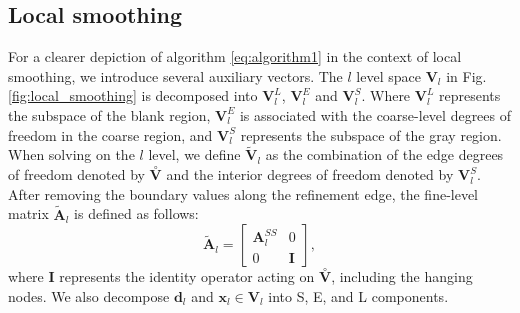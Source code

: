 \documentclass[extra, referee]{gji}
\begin{document}
\subsection{Local smoothing}

For a clearer depiction of algorithm \ref{eq:algorithm1} in the context of local
 smoothing, we introduce several auxiliary vectors. The $l$ level space
 $\mathbf{V}_l$ in Fig. \ref{fig:local_smoothing} is decomposed into $\mathbf{V}_l^L$,
 $\mathbf{V}_l^E$ and $\mathbf{V}_l^S$. Where $\mathbf{V}_l^L$ represents the
 subspace of the blank region, $\mathbf{V}_l^E$ is associated with the
 coarse-level degrees of freedom in the coarse region, and $\mathbf{V}_l^S$
 represents the subspace of the gray region. When solving on the $l$ level, we
 define $\tilde{\mathbf{V}}_l$ as the combination of the edge degrees of freedom
 denoted by $\overset{\circ}{\mathbf{V}}$ and the interior degrees of freedom
 denoted by $\mathbf{V}^S_l$. After removing the boundary values along the
 refinement edge, the fine-level matrix $\tilde{\mathbf{A}}_l$ is defined as
 follows:
 \begin{equation}
   \label{eq:ten1}
      \tilde{\mathbf{A}}_l =
      \begin{bmatrix}
        \mathbf{A}_l^{SS} & 0 \\
        0  & \mathbf{I}
      \end{bmatrix},
 \end{equation}
where $\mathbf{I} $ represents the identity operator acting on
$\overset{\circ}{\mathbf{V}}$, including the hanging nodes. We also decompose
$\mathbf{d}_l$ and $\mathbf{x}_l \in \mathbf{V}_l$ into S, E, and L components.
\end{document}
